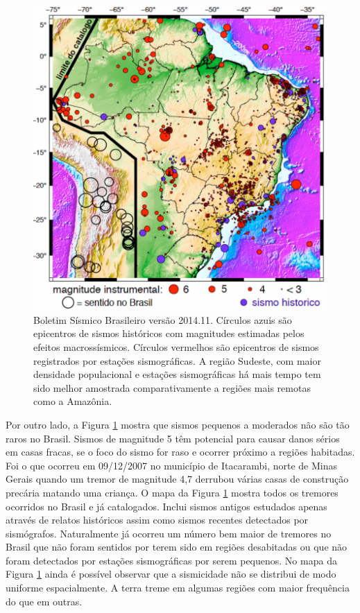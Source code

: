 \documentclass[jgrga]{agutex}
\begin{document}
\begin{article}
\begin{figure}[H]
	\centerline{\includegraphics[width=\hsize]{img_bsb}}
	\caption{Boletim Sísmico Brasileiro \citep{bsb_2014} versão 2014.11. Círculos azuis são epicentros de sismos históricos com magnitudes estimadas pelos efeitos macrossísmicos. Círculos vermelhos são epicentros de sismos registrados por estações sismográficas. A região Sudeste, com maior densidade populacional e estações sismográficas há mais tempo tem sido melhor amostrada comparativamente a regiões mais remotas como a Amazônia.}
	\label{fig_bsb}
\end{figure}

Por outro lado, a Figura \ref{fig_bsb} mostra que sismos pequenos a moderados não são tão raros no Brasil. Sismos de magnitude 5 têm potencial para causar danos sérios em casas fracas, se o foco do sismo for raso e ocorrer próximo a regiões habitadas. Foi o que ocorreu em 09/12/2007 no município de Itacarambi, norte de Minas Gerais quando um tremor de magnitude 4,7 derrubou várias casas de construção precária matando uma criança. O mapa da Figura \ref{fig_bsb} mostra todos os tremores ocorridos no Brasil e já catalogados. Inclui sismos antigos estudados apenas através de relatos históricos assim como sismos recentes detectados por sismógrafos. Naturalmente já ocorreu um número bem maior de tremores no Brasil que não foram sentidos por terem sido em regiões desabitadas ou que não foram detectados por estações sismográficas por serem pequenos. No mapa da Figura \ref{fig_bsb} ainda é possível observar que a sismicidade não se distribui de modo uniforme espacialmente. A terra treme em algumas regiões com maior frequência do que em outras. 


\end{article}
\end{document}
